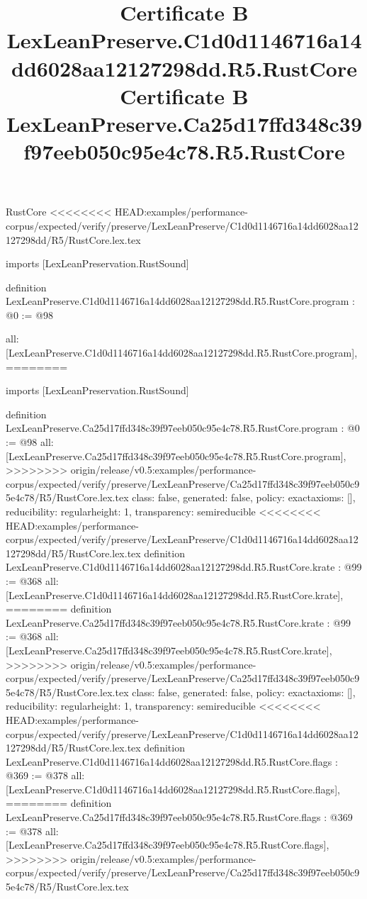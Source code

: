 \begin{lexlean}{RustCore}
<<<<<<<< HEAD:examples/performance-corpus/expected/verify/preserve/LexLeanPreserve/C1d0d1146716a14dd6028aa12127298dd/R5/RustCore.lex.tex
\title{Certificate B LexLeanPreserve.C1d0d1146716a14dd6028aa12127298dd.R5.RustCore}
\begin{coremodule}
imports [LexLeanPreservation.RustSound]

definition LexLeanPreserve.C1d0d1146716a14dd6028aa12127298dd.R5.RustCore.program : @0 := @98 {
  all: [LexLeanPreserve.C1d0d1146716a14dd6028aa12127298dd.R5.RustCore.program],
========
\title{Certificate B LexLeanPreserve.Ca25d17ffd348c39f97eeb050c95e4c78.R5.RustCore}
\begin{coremodule}
imports [LexLeanPreservation.RustSound]

definition LexLeanPreserve.Ca25d17ffd348c39f97eeb050c95e4c78.R5.RustCore.program : @0 := @98 {
  all: [LexLeanPreserve.Ca25d17ffd348c39f97eeb050c95e4c78.R5.RustCore.program],
>>>>>>>> origin/release/v0.5:examples/performance-corpus/expected/verify/preserve/LexLeanPreserve/Ca25d17ffd348c39f97eeb050c95e4c78/R5/RustCore.lex.tex
  class: false,
  generated: false,
  policy: exact{axioms: []},
  reducibility: regular{height: 1},
  transparency: semireducible
}
<<<<<<<< HEAD:examples/performance-corpus/expected/verify/preserve/LexLeanPreserve/C1d0d1146716a14dd6028aa12127298dd/R5/RustCore.lex.tex
definition LexLeanPreserve.C1d0d1146716a14dd6028aa12127298dd.R5.RustCore.krate : @99 := @368 {
  all: [LexLeanPreserve.C1d0d1146716a14dd6028aa12127298dd.R5.RustCore.krate],
========
definition LexLeanPreserve.Ca25d17ffd348c39f97eeb050c95e4c78.R5.RustCore.krate : @99 := @368 {
  all: [LexLeanPreserve.Ca25d17ffd348c39f97eeb050c95e4c78.R5.RustCore.krate],
>>>>>>>> origin/release/v0.5:examples/performance-corpus/expected/verify/preserve/LexLeanPreserve/Ca25d17ffd348c39f97eeb050c95e4c78/R5/RustCore.lex.tex
  class: false,
  generated: false,
  policy: exact{axioms: []},
  reducibility: regular{height: 1},
  transparency: semireducible
}
<<<<<<<< HEAD:examples/performance-corpus/expected/verify/preserve/LexLeanPreserve/C1d0d1146716a14dd6028aa12127298dd/R5/RustCore.lex.tex
definition LexLeanPreserve.C1d0d1146716a14dd6028aa12127298dd.R5.RustCore.flags : @369 := @378 {
  all: [LexLeanPreserve.C1d0d1146716a14dd6028aa12127298dd.R5.RustCore.flags],
========
definition LexLeanPreserve.Ca25d17ffd348c39f97eeb050c95e4c78.R5.RustCore.flags : @369 := @378 {
  all: [LexLeanPreserve.Ca25d17ffd348c39f97eeb050c95e4c78.R5.RustCore.flags],
>>>>>>>> origin/release/v0.5:examples/performance-corpus/expected/verify/preserve/LexLeanPreserve/Ca25d17ffd348c39f97eeb050c95e4c78/R5/RustCore.lex.tex
}}}
\end{coremodule}}
\end{coremodule}
\end{lexlean}
